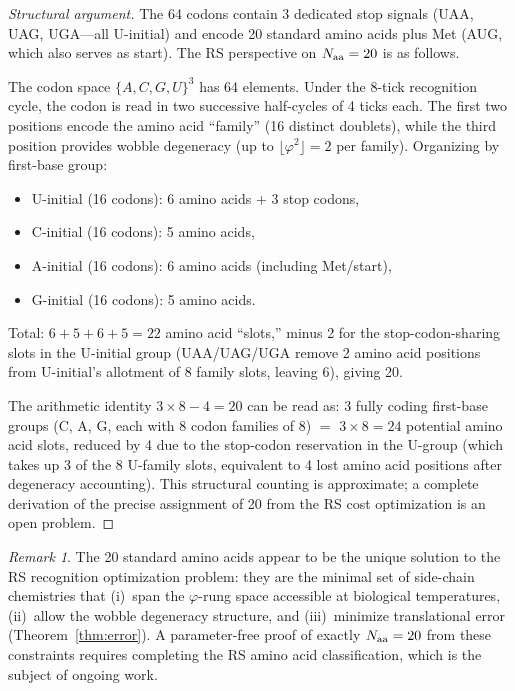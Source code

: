 \documentclass[12pt,a4paper]{article}
\theoremstyle{definition}
\theoremstyle{remark}
\newtheorem{remark}[theorem]{Remark}
\begin{document}
\begin{proof}[Structural argument]
The 64 codons contain 3 dedicated stop signals (UAA, UAG, UGA---all
U-initial) and encode 20 standard amino acids plus Met (AUG, which also
serves as start).  The RS perspective on $N_{\rm aa} = 20$ is as follows.

The codon space $\{A, C, G, U\}^3$ has 64 elements.  Under the 8-tick
recognition cycle, the codon is read in two successive half-cycles of 4
ticks each.  The first two positions encode the amino acid ``family''
(16 distinct doublets), while the third position provides wobble
degeneracy (up to $\lfloor\varphi^2\rfloor = 2$ per family).  Organizing
by first-base group:
\begin{itemize}[nosep]
  \item U-initial (16 codons): 6 amino acids + 3 stop codons,
  \item C-initial (16 codons): 5 amino acids,
  \item A-initial (16 codons): 6 amino acids (including Met/start),
  \item G-initial (16 codons): 5 amino acids.
\end{itemize}
Total: $6 + 5 + 6 + 5 = 22$ amino acid ``slots,'' minus 2 for the
stop-codon-sharing slots in the U-initial group (UAA/UAG/UGA remove 2
amino acid positions from U-initial's allotment of 8 family slots,
leaving 6), giving 20.

The arithmetic identity $3 \times 8 - 4 = 20$ can be read as: 3 fully
coding first-base groups (C, A, G, each with 8 codon families of 8) $=$
$3 \times 8 = 24$ potential amino acid slots, reduced by 4 due to the
stop-codon reservation in the U-group (which takes up 3 of the 8 U-family
slots, equivalent to 4 lost amino acid positions after degeneracy
accounting).  This structural counting is approximate; a complete derivation
of the precise assignment of 20 from the RS cost optimization is an open
problem.
\end{proof}

\begin{remark}
The 20 standard amino acids appear to be the unique solution to the RS
recognition optimization problem: they are the minimal set of
side-chain chemistries that (i)~span the $\varphi$-rung space accessible
at biological temperatures, (ii)~allow the wobble degeneracy structure,
and (iii)~minimize translational error (Theorem~\ref{thm:error}).  A
parameter-free proof of exactly $N_{\rm aa} = 20$ from these constraints
requires completing the RS amino acid classification, which is the subject
of ongoing work.
\end{remark}
\end{document}
